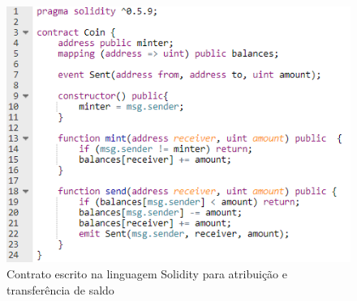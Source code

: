 \begin{figure}[htb]
 \caption{Contrato escrito na linguagem Solidity para atribuição e transferência de saldo}
 \label{fig:exemplo-contrato-solidity}
 \centering
 \includegraphics[scale=0.7]{figuras/exemplo_codigo_solidity.png}
\end{figure}

